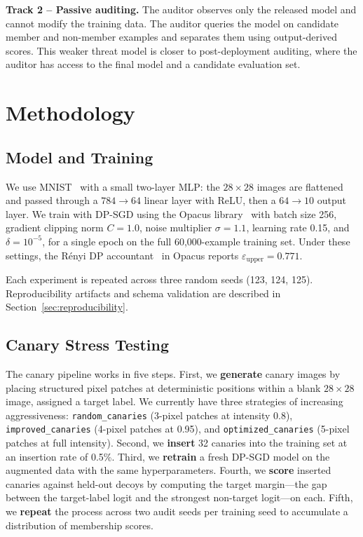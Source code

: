 \documentclass{article}
\begin{document}
\textbf{Track 2 -- Passive auditing.} The auditor observes only the released model and cannot modify the training data. The auditor queries the model on candidate member and non-member examples and separates them using output-derived scores. This weaker threat model is closer to post-deployment auditing, where the auditor has access to the final model and a candidate evaluation set.

\section{Methodology}

\subsection{Model and Training}

We use MNIST~\citep{lecun1998mnist} with a small two-layer MLP: the $28 \times 28$ images are flattened and passed through a $784 \to 64$ linear layer with ReLU, then a $64 \to 10$ output layer. We train with DP-SGD using the Opacus library~\citep{yousefpour2021opacus} with batch size 256, gradient clipping norm $C = 1.0$, noise multiplier $\sigma = 1.1$, learning rate 0.15, and $\delta = 10^{-5}$, for a single epoch on the full 60{,}000-example training set. Under these settings, the R\'{e}nyi DP accountant~\citep{mironov2017renyi} in Opacus reports $\varepsilon_{\text{upper}} = 0.771$.

Each experiment is repeated across three random seeds (123, 124, 125). Reproducibility artifacts and schema validation are described in Section~\ref{sec:reproducibility}.

\subsection{Canary Stress Testing}

The canary pipeline works in five steps. First, we \textbf{generate} canary images by placing structured pixel patches at deterministic positions within a blank $28 \times 28$ image, assigned a target label. We currently have three strategies of increasing aggressiveness: \texttt{random\_canaries} (3-pixel patches at intensity 0.8), \texttt{improved\_canaries} (4-pixel patches at 0.95), and \texttt{optimized\_canaries} (5-pixel patches at full intensity). Second, we \textbf{insert} 32 canaries into the training set at an insertion rate of 0.5\%. Third, we \textbf{retrain} a fresh DP-SGD model on the augmented data with the same hyperparameters. Fourth, we \textbf{score} inserted canaries against held-out decoys by computing the target margin---the gap between the target-label logit and the strongest non-target logit---on each. Fifth, we \textbf{repeat} the process across two audit seeds per training seed to accumulate a distribution of membership scores.
\end{document}
